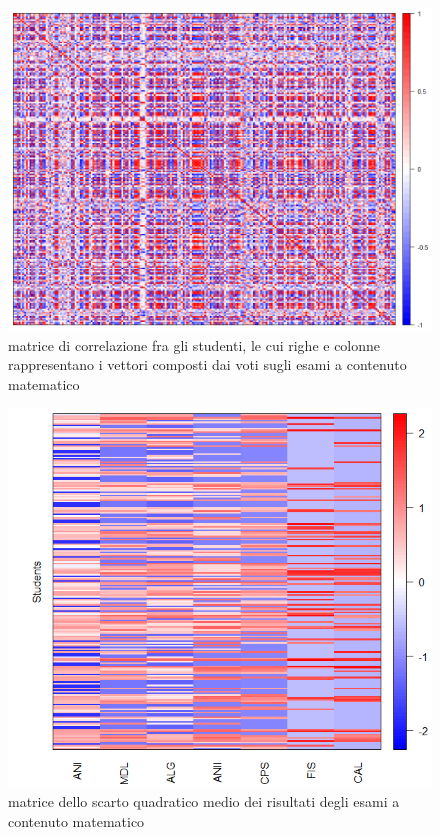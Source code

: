                 \begin{figure}
                    \centering
                    \caption{matrice di correlazione fra gli studenti, le cui righe e colonne rappresentano i vettori composti dai voti sugli esami a contenuto matematico}
                    \label{esami_mat_corr}
                	\includegraphics[scale=0.38]{img/corr_matrix_3.png}
                \end{figure}

                \begin{figure}
                    \centering
                    \caption{matrice dello scarto quadratico medio dei risultati degli esami a contenuto matematico}
                    \label{esami_mat_stddev}
                	\includegraphics[scale=0.75]{img/std_dev_matrix_3.png}
                \end{figure}

